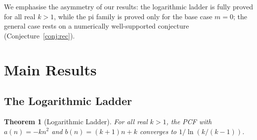 \documentclass[11pt,a4paper]{article}
\theoremstyle{plain}
\newtheorem{theorem}{Theorem}
\theoremstyle{remark}
\begin{document}
We emphasise the asymmetry of our results: the logarithmic ladder
is fully proved for all real $k > 1$, while the pi family is proved
only for the base case $m = 0$; the general case rests on a
numerically well-supported conjecture (Conjecture~\ref{conj:rec}).

\section{Main Results}

\subsection{The Logarithmic Ladder}

\begin{theorem}[Logarithmic Ladder]\label{thm:log}
For all real $k > 1$, the PCF with
$a(n) = -kn^2$ and $b(n) = (k{+}1)n + k$
converges to $1/\ln(k/(k{-}1))$.
\end{theorem}
\end{document}
